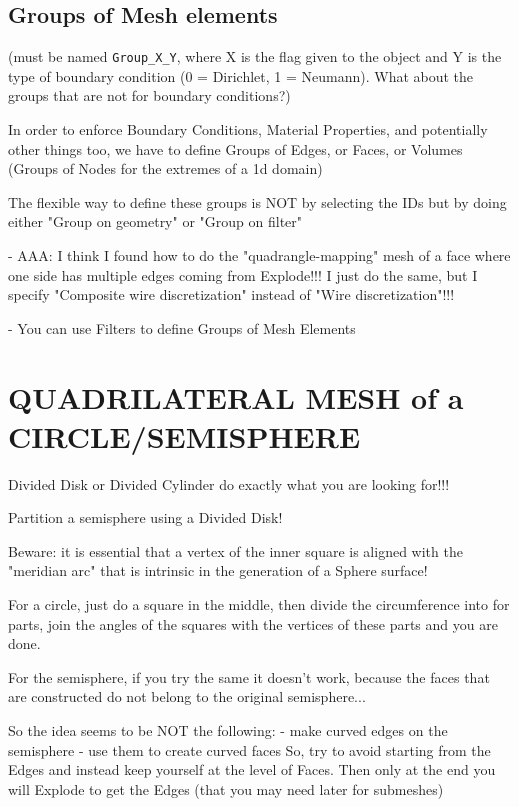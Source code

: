\documentclass[10pt]{book}
\begin{document}
\subsection{Groups of Mesh elements}
 
  (must be named \verb|Group_X_Y|, where X is the flag given to the object and Y is the type of boundary condition (0 = Dirichlet, 1 = Neumann). What about the groups that are not for boundary conditions?)

  In order to enforce Boundary Conditions, Material Properties, and potentially other things too,
  we have to define Groups of Edges, or Faces, or Volumes (Groups of Nodes for the extremes of a 1d domain)
  
  The flexible way to define these groups is NOT by selecting the IDs but by doing either "Group on geometry" or "Group on filter"

- AAA: I think I found how to do the "quadrangle-mapping" mesh of a face where one side has multiple edges coming from Explode!!! 
  I just do the same, but I specify "Composite wire discretization" instead of "Wire discretization"!!!

- You can use Filters to define Groups of Mesh Elements


  
\section{QUADRILATERAL MESH of a CIRCLE/SEMISPHERE}

Divided Disk or Divided Cylinder do exactly what you are looking for!!!

Partition a semisphere using a Divided Disk!

Beware: it is essential that a vertex of the inner square is aligned with the "meridian arc" that is intrinsic in the generation of a Sphere surface!

For a circle, just do a square in the middle, then divide the circumference into for parts,
join the angles of the squares with the vertices of these parts and you are done.

For the semisphere, if you try the same it doesn't work, because the faces that are constructed
do not belong to the original semisphere...

So the idea seems to be NOT the following:
 - make curved edges on the semisphere
 - use them to create curved faces
  So, try to avoid starting from the Edges and instead keep yourself at the level of Faces.
  Then only at the end you will Explode to get the Edges (that you may need later for submeshes)
  
\end{document}
